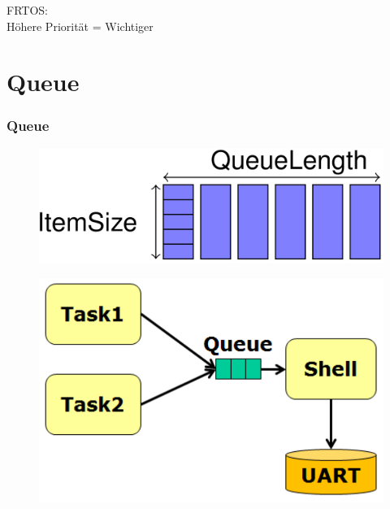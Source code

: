\begin{frame}
  \begin{center}
    FRTOS:\\
    H\"ohere Priorit\"at = Wichtiger\\
  \end{center}
\end{frame}


\section{Queue}
\begin{frame}
  \tableofcontents[
	    currentsection, 
	    hideothersections, 
	    sectionstyle=show/shaded, 
	    subsectionstyle=hide
	]
\end{frame}


\begin{frame}
  \frametitle{Queue}

  \begin{figure}
  \includegraphics[scale=0.15]{pic/01_queue/queue_01.png} 
  \end{figure}
  
  \begin{figure}
  \includegraphics[scale=0.15]{pic/01_queue/queue_02.png} 
  \end{figure}
  
  
\end{frame}


